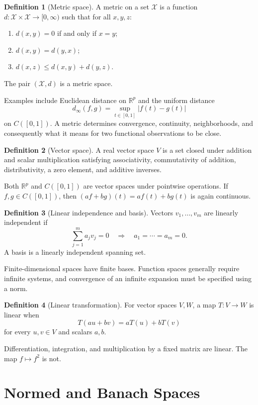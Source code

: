 \documentclass[12pt,oneside]{book}
\numberwithin{equation}{section}
\theoremstyle{definition}
\newtheorem{definition}{Definition}[section]
\theoremstyle{plain}
\theoremstyle{remark}
\newcommand{\R}{\mathbb{R}}
\newcommand{\abs}[1]{\left\lvert #1 \right\rvert}
\begin{document}
\begin{definition}[Metric space]
A metric on a set $\mathcal X$ is a function
$d:\mathcal X\times\mathcal X\to[0,\infty)$ such that for all $x,y,z$:
\begin{enumerate}
    \item $d(x,y)=0$ if and only if $x=y$;
    \item $d(x,y)=d(y,x)$;
    \item $d(x,z)\leq d(x,y)+d(y,z)$.
\end{enumerate}
The pair $(\mathcal X,d)$ is a metric space.
\end{definition}

Examples include Euclidean distance on $\R^p$ and the uniform distance
\[
    d_\infty(f,g)=\sup_{t\in[0,1]}\abs{f(t)-g(t)}
\]
on $C([0,1])$. A metric determines convergence, continuity, neighborhoods,
and consequently what it means for two functional observations to be close.

\begin{definition}[Vector space]
A real vector space $V$ is a set closed under addition and scalar
multiplication satisfying associativity, commutativity of addition,
distributivity, a zero element, and additive inverses.
\end{definition}

Both $\R^p$ and $C([0,1])$ are vector spaces under pointwise operations. If
$f,g\in C([0,1])$, then
$(af+bg)(t)=af(t)+bg(t)$ is again continuous.

\begin{definition}[Linear independence and basis]
Vectors $v_1,\ldots,v_m$ are linearly independent if
\[
    \sum_{j=1}^ma_jv_j=0\quad\Longrightarrow\quad a_1=\cdots=a_m=0.
\]
A basis is a linearly independent spanning set.
\end{definition}

Finite-dimensional spaces have finite bases. Function spaces generally
require infinite systems, and convergence of an infinite expansion must be
specified using a norm.

\begin{definition}[Linear transformation]
For vector spaces $V,W$, a map $T:V\to W$ is linear when
\[
    T(au+bv)=aT(u)+bT(v)
\]
for every $u,v\in V$ and scalars $a,b$.
\end{definition}

Differentiation, integration, and multiplication by a fixed matrix are linear.
The map $f\mapsto f^2$ is not.

\section{Normed and Banach Spaces}
\end{document}
